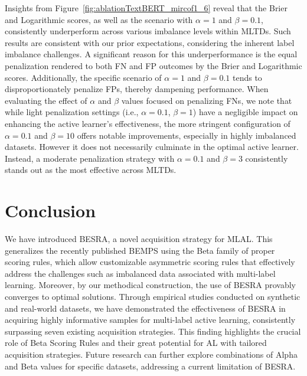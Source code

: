 \documentclass[letterpaper]{article} %
\begin{document}
Insights from Figure~\ref{fig:ablationTextBERT_mircof1_6} reveal that the Brier and Logarithmic scores, as well as the scenario with $\alpha=1$ and $\beta=0.1$, consistently underperform across various imbalance levels within MLTDs.
Such results are consistent with our prior expectations, considering the inherent label imbalance challenges.
A significant reason for this underperformance is the equal penalization rendered to both FN and FP outcomes by the Brier and Logarithmic scores. Additionally, the specific scenario of $\alpha=1$ and $\beta=0.1$ tends to disproportionately penalize FPs, thereby dampening performance. When evaluating the effect of $\alpha$ and $\beta$ values focused on penalizing FNs, we note that while light penalization settings (i.e., $\alpha=0.1$, $\beta=1$) have a negligible impact on enhancing the active learner's effectiveness, the more stringent configuration of $\alpha=0.1$ and $\beta=10$ offers notable improvements, especially in highly imbalanced datasets. However it does not necessarily culminate in the optimal active learner.
Instead, a moderate penalization strategy with $\alpha=0.1$ and $\beta=3$ consistently stands out as the most effective across MLTDs.







\section{Conclusion}

We have introduced BESRA, a novel acquisition strategy for MLAL.
This generalizes the recently published BEMPS using the Beta family of proper scoring rules,
which allow customizable asymmetric scoring rules
that effectively address the challenges such as imbalanced data associated with multi-label learning.
Moreover, by our methodical construction, the use of BESRA provably converges to optimal solutions.
Through empirical studies conducted on synthetic and real-world datasets, we have demonstrated
the effectiveness of BESRA in acquiring highly informative samples for multi-label active learning,
consistently surpassing seven existing acquisition strategies.
This finding highlights the crucial role of Beta Scoring Rules and their great potential for AL with tailored acquisition strategies.
Future research can further explore combinations of Alpha and Beta values for specific datasets, addressing a current limitation of BESRA.
\end{document}

